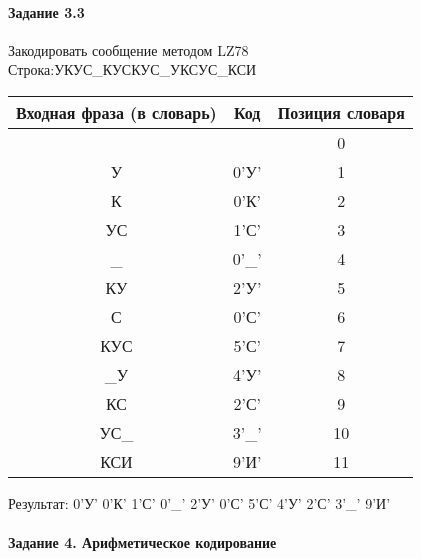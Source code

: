 \documentclass[a4paper, 12pt]{article}
\begin{document}
\paragraph{Задание 3.3}

Закодировать сообщение методом LZ78\\
Строка:УКУС\_КУСКУС\_УКСУС\_КСИ\\
\begin{table}[h!]
\centering
\begin{tabular}{|c|c|c|} 
\hline
 Входная фраза (в словарь) & Код & Позиция словаря \\ \hline

 &  & 0 \\ \hline
У & 0'У' & 1 \\ \hline
К & 0'К' & 2 \\ \hline
УС & 1'С' & 3 \\ \hline
\_ & 0'\_' & 4 \\ \hline
КУ & 2'У' & 5 \\ \hline
С & 0'С' & 6 \\ \hline
КУС & 5'С' & 7 \\ \hline
\_У & 4'У' & 8 \\ \hline
КС & 2'С' & 9 \\ \hline
УС\_ & 3'\_' & 10 \\ \hline
КСИ & 9'И' & 11 \\ \hline
\end{tabular}
\end{table}

Результат: 0'У' 0'К' 1'С' 0'\_' 2'У' 0'С' 5'С' 4'У' 2'С' 3'\_' 9'И'\\
\pagebreak
\paragraph{Задание 4. Арифметическое кодирование\\}
\end{document}
